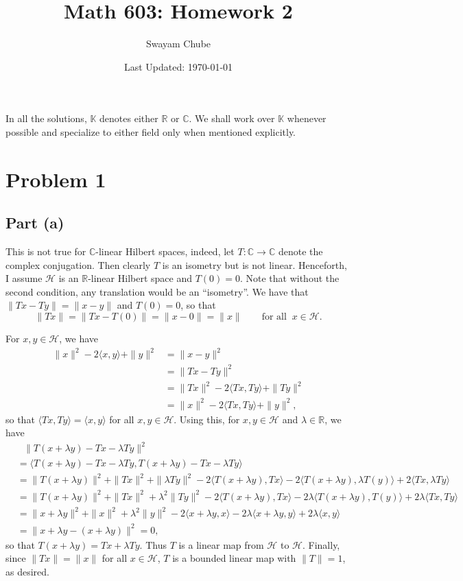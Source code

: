 \documentclass[11pt]{article}
\title{Math 603: Homework 2}
\author{Swayam Chube}
\date{Last Updated: \today}
\theoremstyle{thmstyle}
\theoremstyle{defstyle}
\newcommand{\R}{\mathbb{R}}
\newcommand{\bbC}{\mathbb{C}}
\newcommand{\K}{\mathbb{K}} %
\newcommand{\calH}{\mathcal{H}}
\begin{document}
\maketitle

In all the solutions, $\K$ denotes either $\R$ or $\bbC$. We shall work over $\K$ whenever possible and specialize to either field only when mentioned explicitly.

\section{Problem 1}

\subsection{Part (a)}

This is not true for $\bbC$-linear Hilbert spaces, indeed, let $T\colon\bbC\to\bbC$ denote the complex conjugation. Then clearly $T$ is an isometry but is not linear. Henceforth, I assume $\calH$ is an $\R$-linear Hilbert space and $T(0) = 0$. Note that without the second condition, any translation would be an ``isometry''. We have that $\|Tx - Ty\| = \|x - y\|$ and $T(0) = 0$, so that 
\begin{equation*}
    \|Tx\| = \|Tx - T(0)\| = \|x - 0\| = \|x\|\qquad\text{for all }~x\in\calH.
\end{equation*}

For $x, y\in\calH$, we have 
\begin{align*}
    \|x\|^2 - 2\langle x, y\rangle + \|y\|^2 &= \|x -  y\|^2\\
    &= \|Tx - Ty\|^2 \\
    &= \|Tx\|^2 - 2\langle Tx, Ty\rangle + \|Ty\|^2\\
    &= \|x\|^2 - 2\langle Tx, Ty\rangle + \|y\|^2,
\end{align*}
so that $\langle Tx, Ty\rangle = \langle x, y\rangle$ for all $x, y\in\calH$. Using this, for $x, y\in\calH$ and $\lambda\in\R$, we have 
\begin{align*}
    &~~~\|T(x + \lambda y) - Tx - \lambda Ty\|^2 \\
    &= \langle T(x + \lambda y) - Tx - \lambda Ty, T(x + \lambda y) - Tx - \lambda Ty\rangle\\
    &= \|T(x + \lambda y)\|^2 + \|Tx\|^2 + \|\lambda Ty\|^2 - 2\langle T(x + \lambda y), Tx\rangle - 2\langle T(x + \lambda y), \lambda T(y)\rangle + 2\langle Tx, \lambda Ty\rangle\\
    &= \|T(x + \lambda y)\|^2 + \|Tx\|^2 + \lambda^2\|Ty\|^2 - 2\langle T(x + \lambda y), Tx\rangle - 2\lambda\langle T(x + \lambda y), T(y)\rangle + 2\lambda\langle Tx, Ty\rangle\\
    &= \|x + \lambda y\|^2 + \|x\|^2 + \lambda^2\|y\|^2 - 2\langle x + \lambda y, x\rangle - 2\lambda\langle x + \lambda y, y\rangle + 2\lambda\langle x, y\rangle\\
    &= \|x + \lambda y - (x + \lambda y)\|^2 = 0,
\end{align*}
so that $T(x + \lambda y) = Tx + \lambda Ty$. Thus $T$ is a linear map from $\calH$ to $\calH$. Finally, since $\|Tx\| = \|x\|$ for all $x\in\calH$, $T$ is a bounded linear map with $\|T\| = 1$, as desired. 
\end{document}
